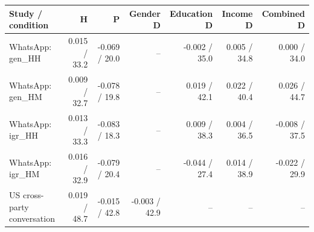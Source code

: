 
\begin{tabular}{lrrrrrr}
\toprule
Study / condition & H & P & Gender D & Education D & Income D & Combined D\\
\midrule
WhatsApp: gen\_HH & 0.015 / 33.2 & -0.069 / 20.0 & -- & -0.002 / 35.0 & 0.005 / 34.8 & 0.000 / 34.0\\
WhatsApp: gen\_HM & 0.009 / 32.7 & -0.078 / 19.8 & -- & 0.019 / 42.1 & 0.022 / 40.4 & 0.026 / 44.7\\
WhatsApp: igr\_HH & 0.013 / 33.3 & -0.083 / 18.3 & -- & 0.009 / 38.3 & 0.004 / 36.5 & -0.008 / 37.5\\
WhatsApp: igr\_HM & 0.016 / 32.9 & -0.079 / 20.4 & -- & -0.044 / 27.4 & 0.014 / 38.9 & -0.022 / 29.9\\
US cross-party conversation & 0.019 / 48.7 & -0.015 / 42.8 & -0.003 / 42.9 & -- & -- & --\\
\bottomrule
\end{tabular}
